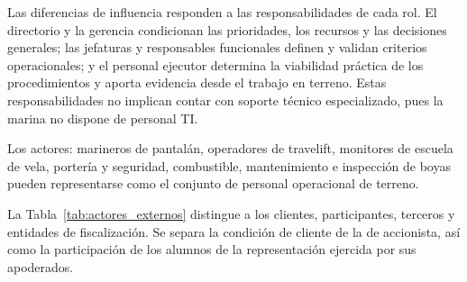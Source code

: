 \endgroup

Las diferencias de influencia responden a las responsabilidades de cada rol. El directorio y la gerencia condicionan las prioridades, los recursos y las decisiones generales; las jefaturas y responsables funcionales definen y validan criterios operacionales; y el personal ejecutor determina la viabilidad práctica de los procedimientos y aporta evidencia desde el trabajo en terreno. Estas responsabilidades no implican contar con soporte técnico especializado, pues la marina no dispone de personal TI.

Los actores: marineros de pantalán, operadores de travelift, monitores de escuela de vela, portería y seguridad, combustible, mantenimiento e inspección de boyas pueden representarse como el conjunto de personal operacional de terreno.

La Tabla~\ref{tab:actores_externos} distingue a los clientes, participantes, terceros y entidades de fiscalización. Se separa la condición de cliente de la de accionista, así como la participación de los alumnos de la representación ejercida por sus apoderados.

\begingroup
\setlength{\tabcolsep}{3pt}

